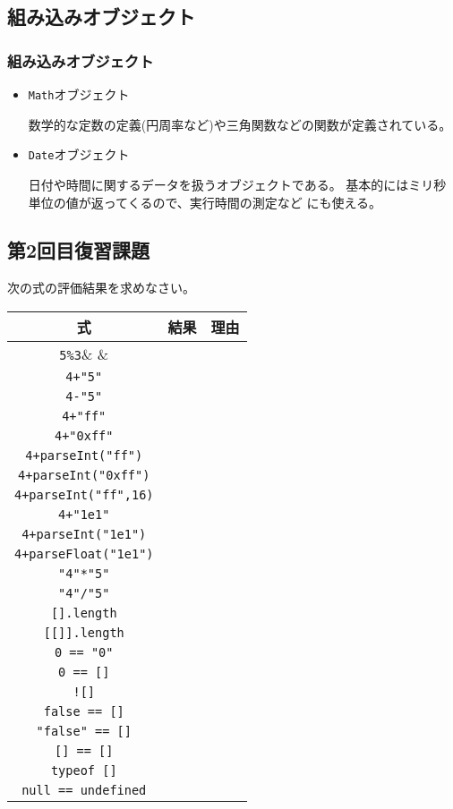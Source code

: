 \subsection{組み込みオブジェクト}
\begin{frame}[containsverbatim]
 \frametitle{組み込みオブジェクト}
\begin{itemize}
 \item {\texttt{Math}オブジェクト}

数学的な定数の定義(円周率など)や三角関数などの関数が定義されている。
 \item \texttt{Date}オブジェクト

日付や時間に関するデータを扱うオブジェクトである。
基本的にはミリ秒単位の値が返ってくるので、実行時間の測定など
にも使える。
\end{itemize}
\end{frame}



\subsection{第2回目復習課題}
\newcommand{\Rule}{\rule[-2ex]{0em}{5ex}}
次の式の評価結果を求めなさい。
\begin{center}
 \begin{tabular}{|>{\Rule}c|p{}|p{}|}\hline
  式&\multicolumn{1}{c|}{結果} &\multicolumn{1}{c|}{理由} \\\hline
  \Verb+5%
  \Verb-4+"5"-& & \\ \hline
  \Verb+4-"5"+& & \\ \hline
  \Verb-4+"ff"-& & \\ \hline
  \Verb-4+"0xff"-& & \\ \hline
  \Verb-4+parseInt("ff")-& & \\ \hline
  \Verb-4+parseInt("0xff")-& & \\ \hline
  \Verb-4+parseInt("ff",16)-& & \\ \hline
  \Verb-4+"1e1"-& & \\ \hline
  \Verb-4+parseInt("1e1")-& & \\ \hline
  \Verb-4+parseFloat("1e1")-& & \\ \hline
  \Verb+"4"*"5"+& & \\ \hline
  \Verb+"4"/"5"+& & \\ \hline
  \Verb+[].length+& & \\ \hline
  \Verb+[[]].length+& & \\ \hline
  \Verb+0 == "0"+& & \\ \hline
  \Verb+0 == []+& & \\ \hline
  \Verb+![]+& & \\ \hline
  \Verb+false == []+& & \\ \hline
  \Verb+"false" == []+& & \\ \hline
  \Verb+[] == []+& & \\ \hline
  \Verb+typeof []+& & \\ \hline
  \Verb+null == undefined+& & \\ \hline
 \end{tabular}
\end{center}
